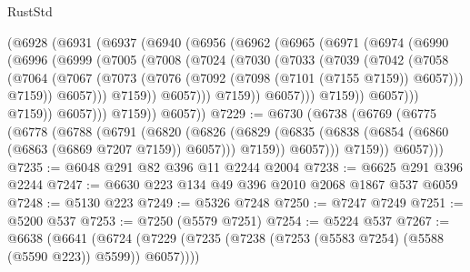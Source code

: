 \begin{lexlean}{RustStd}
\begin{coremodule}
{\begin{coremodule}
{{{{{{{{{{{{{{{{{{{{{{{{{{{{{{{                (@6928
                  (@6931
                    (@6937
                      (@6940
                        (@6956
                          (@6962
                            (@6965
                              (@6971
                                (@6974
                                  (@6990
                                    (@6996
                                      (@6999
                                        (@7005
                                          (@7008
                                            (@7024
                                              (@7030
                                                (@7033
                                                  (@7039
                                                    (@7042
                                                      (@7058
                                                        (@7064
                                                          (@7067
                                                            (@7073
                                                              (@7076
                                                                (@7092
                                                                  (@7098
                                                                    (@7101 (@7155 @7159))
                                                                    @6057)))
                                                              @7159))
                                                          @6057)))
                                                    @7159))
                                                @6057)))
                                          @7159))
                                      @6057)))
                                @7159))
                            @6057)))
                      @7159))
                  @6057)))
            @7159))
        @6057))
@7229 := @6730
    (@6738
      (@6769
        (@6775
          (@6778
            (@6788
              (@6791
                (@6820
                  (@6826
                    (@6829 (@6835 (@6838 (@6854 (@6860 (@6863 (@6869 @7207 @7159)) @6057))) @7159))
                    @6057)))
              @7159))
          @6057)))
@7235 := @6048 @291 @82 @396 @11 @2244 @2004
@7238 := @6625 @291 @396 @2244
@7247 := @6630 @223 @134 @49 @396 @2010 @2068 @1867 @537 @6059
@7248 := @5130 @223
@7249 := @5326 @7248
@7250 := @7247 @7249
@7251 := @5200 @537
@7253 := @7250 (@5579 @7251)
@7254 := @5224 @537
@7267 := @6638
    (@6641 (@6724 (@7229 (@7235 (@7238 (@7253 (@5583 @7254) (@5588 (@5590 @223)) @5599)) @6057))))
}}}}}}}}}}}}}}}}}}}}}}}}}}}}}}}
\end{coremodule}}
\end{coremodule}
\end{lexlean}
